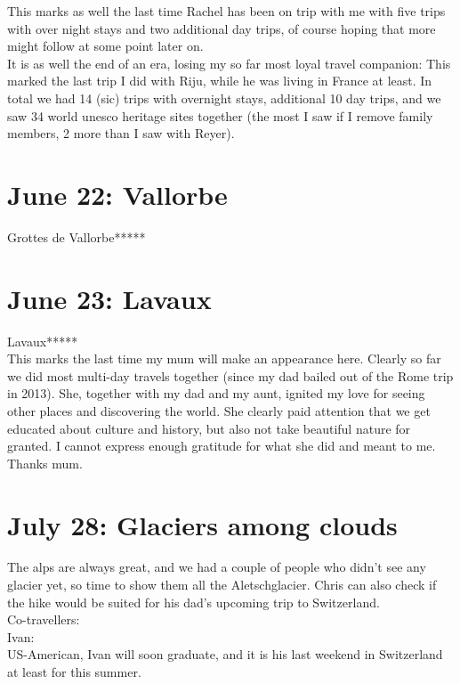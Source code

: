 This marks as well the last time Rachel has been on trip with me with five trips with over night stays and two additional day trips, of course hoping that more might follow at some point later on.\\
It is as well the end of an era, losing my so far most loyal travel companion: This marked the last trip I did with Riju, while he was living in France at least. In total we had 14 (sic) trips with overnight stays, additional 10 day trips, and we saw 34 world unesco heritage sites together (the most I saw if I remove family members, 2 more than I saw with Reyer). 

\section{June 22: Vallorbe}
\label{Vallorbe2019}

Grottes de Vallorbe*****

\section{June 23: Lavaux}
\label{Valaux2019}

Lavaux*****\\

This marks the last time my mum will make an appearance here. Clearly so far we did most multi-day travels together (since my dad bailed out of the Rome trip in 2013). She, together with my dad and my aunt, ignited my love for seeing other places and discovering the world. She clearly paid attention that we get educated about culture and history, but also not take beautiful nature for granted. I cannot express enough gratitude for what she did and meant to me. Thanks mum.

\section{July 28: Glaciers among clouds}
\label{2019:Fiesch}

The alps are always great, and we had a couple of people who didn't see any glacier yet, so time to show them all the Aletschglacier. Chris can also check if the hike would be suited for his dad's upcoming trip to Switzerland.\\

Co-travellers:\\
Ivan:\\
US-American, Ivan will soon graduate, and it is his last weekend in Switzerland at least for this summer.\\


